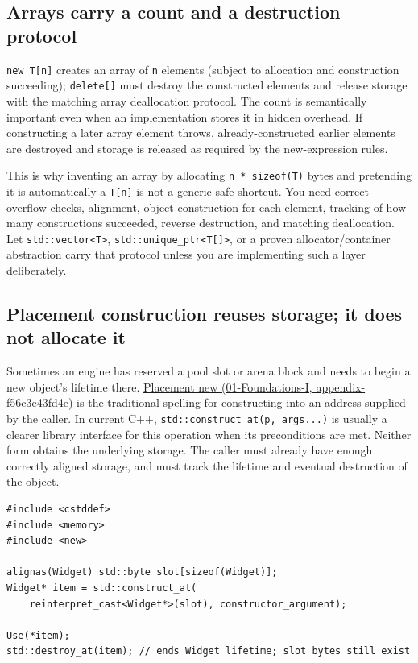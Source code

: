 \subsection{Arrays carry a count and a destruction protocol}\label{05-engine-i-ch004-arrays-carry-a-count-and-a-destruction-protocol}

\texttt{new\ T{[}n{]}} creates an array of \texttt{n} elements (subject to allocation and construction succeeding); \texttt{delete{[}{]}} must destroy the constructed elements and release storage with the matching array deallocation protocol. The count is semantically important even when an implementation stores it in hidden overhead. If constructing a later array element throws, already-constructed earlier elements are destroyed and storage is released as required by the new-expression rules.

This is why inventing an array by allocating \texttt{n\ *\ sizeof(T)} bytes and pretending it is automatically a \texttt{T{[}n{]}} is not a generic safe shortcut. You need correct overflow checks, alignment, object construction for each element, tracking of how many constructions succeeded, reverse destruction, and matching deallocation. Let \texttt{std::vector\textless{}T\textgreater{}}, \texttt{std::unique\_ptr\textless{}T{[}{]}\textgreater{}}, or a proven allocator/container abstraction carry that protocol unless you are implementing such a layer deliberately.

\subsection{Placement construction reuses storage; it does not allocate it}\label{05-engine-i-ch004-placement-construction-reuses-storage-it-does-not-allocate-it}

Sometimes an engine has reserved a pool slot or arena block and needs to begin a new object's lifetime there. \href{../01-Foundations-I/main.pdf\#nameddest=appendix-f56c3e43fd4e}{Placement new (01-Foundations-I, appendix-f56c3e43fd4e)} is the traditional spelling for constructing into an address supplied by the caller. In current C++, \texttt{std::construct\_at(p,\ args...)} is usually a clearer library interface for this operation when its preconditions are met. Neither form obtains the underlying storage. The caller must already have enough correctly aligned storage, and must track the lifetime and eventual destruction of the object.

\begin{verbatim}
#include <cstddef>
#include <memory>
#include <new>

alignas(Widget) std::byte slot[sizeof(Widget)];
Widget* item = std::construct_at(
    reinterpret_cast<Widget*>(slot), constructor_argument);

Use(*item);
std::destroy_at(item); // ends Widget lifetime; slot bytes still exist
\end{verbatim}

